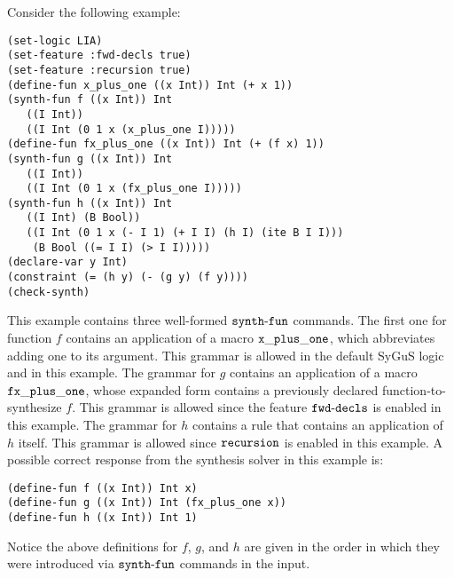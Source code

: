 \documentclass[english,a4paper,10pt]{article}
\begin{document}
\begin{example}
Consider the following example:
\begin{lstlisting}[basicstyle={\ttfamily}]
(set-logic LIA)
(set-feature :fwd-decls true)
(set-feature :recursion true)
(define-fun x_plus_one ((x Int)) Int (+ x 1))
(synth-fun f ((x Int)) Int
   ((I Int))
   ((I Int (0 1 x (x_plus_one I)))))
(define-fun fx_plus_one ((x Int)) Int (+ (f x) 1))
(synth-fun g ((x Int)) Int
   ((I Int))
   ((I Int (0 1 x (fx_plus_one I)))))
(synth-fun h ((x Int)) Int
   ((I Int) (B Bool))
   ((I Int (0 1 x (- I 1) (+ I I) (h I) (ite B I I)))
    (B Bool ((= I I) (> I I)))))
(declare-var y Int)
(constraint (= (h y) (- (g y) (f y))))
(check-synth)
\end{lstlisting}
This example contains three well-formed ${\tt synth\mbox{-}fun}$ commands.
The first one for function $f$ contains an application of a macro ${\tt x\_plus\_one}$,
which abbreviates adding one to its argument.
This grammar is allowed in the default SyGuS logic
and in this example.
The grammar for $g$ contains an application of a macro ${\tt fx\_plus\_one}$,
whose expanded form contains a previously declared function-to-synthesize $f$.
This grammar is allowed since the feature ${\tt fwd\mbox{-}decls}$ is enabled in this example.
The grammar for $h$ contains a rule that contains an application of $h$ itself.
This grammar is allowed since ${\tt recursion}$ is enabled in this example.
A possible correct response from the synthesis solver in this example is:
\begin{lstlisting}[basicstyle={\ttfamily}]
(define-fun f ((x Int)) Int x)
(define-fun g ((x Int)) Int (fx_plus_one x))
(define-fun h ((x Int)) Int 1)
\end{lstlisting}
Notice the above definitions for $f$, $g$, and $h$ are given 
in the order in which they were introduced via ${\tt synth\mbox{-}fun}$ commands
in the input.
\end{example}
\end{document}
